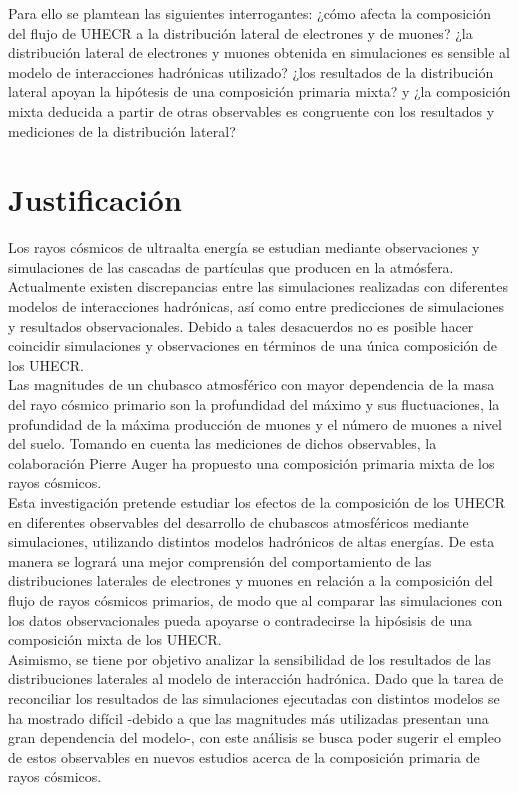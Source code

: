 Para ello se plamtean las siguientes interrogantes: ¿cómo afecta la composición del flujo de UHECR a la distribución lateral de electrones y de muones? ¿la distribución lateral de electrones y muones obtenida en simulaciones es sensible al modelo de interacciones hadrónicas utilizado? ¿los resultados de la distribución lateral apoyan la hipótesis de una composición primaria mixta? y ¿la composición mixta deducida a partir de otras observables es congruente con los resultados y mediciones de la distribución lateral?

\section{Justificación}
Los rayos cósmicos de ultraalta energía se estudian mediante observaciones y simulaciones de las cascadas de partículas que producen en la atmósfera. Actualmente existen discrepancias entre las simulaciones realizadas con diferentes modelos de interacciones hadrónicas, así como entre predicciones de simulaciones y resultados observacionales. Debido a tales desacuerdos no es posible hacer coincidir simulaciones y observaciones en términos de una única composición de los UHECR.\\

Las magnitudes de un chubasco atmosférico con mayor dependencia de la masa del rayo cósmico primario son la profundidad del máximo y sus fluctuaciones, la profundidad de la máxima producción de muones y el número de muones a nivel del suelo. Tomando en cuenta las mediciones de dichos observables, la colaboración Pierre Auger ha propuesto una composición primaria mixta de los rayos cósmicos. \\

Esta investigación pretende estudiar los efectos de la composición de los UHECR en diferentes observables del desarrollo de chubascos atmosféricos mediante simulaciones, utilizando distintos modelos hadrónicos de altas energías. De esta manera se logrará una mejor comprensión del comportamiento de las distribuciones laterales de electrones y muones en relación a la composición del flujo de rayos cósmicos primarios, de modo que al comparar las simulaciones con los datos observacionales pueda apoyarse o contradecirse la hipósisis de una composición mixta de los UHECR.\\

Asimismo, se tiene por objetivo analizar la sensibilidad de los resultados de las distribuciones laterales al modelo de interacción hadrónica. Dado que la tarea de reconciliar los resultados de las simulaciones ejecutadas con distintos modelos se ha mostrado difícil -debido a que las magnitudes más utilizadas presentan una gran dependencia del modelo-, con este análisis se busca poder sugerir el empleo de estos observables en nuevos estudios acerca de la composición primaria de rayos cósmicos.


